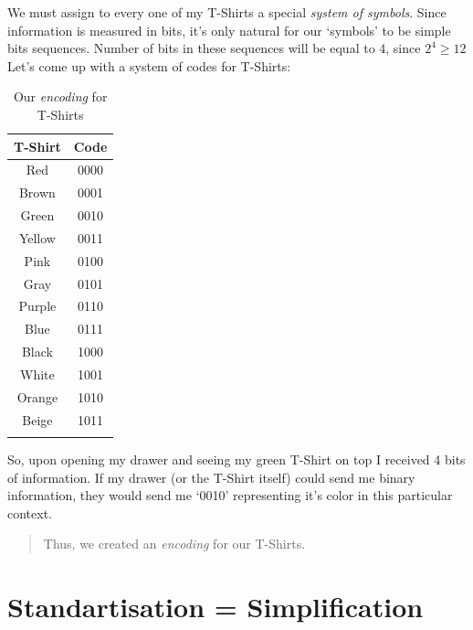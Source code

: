 \documentclass{report}
\begin{document}
            We must assign to every one of my T-Shirts a special \emph{system of symbols}. Since information is measured in bits, it's only natural for our `symbols' to 
            be simple bits sequences. Number of bits in these sequences will be equal to 4, since $2^4 \geq 12$\\
            Let's come up with a system of codes for T-Shirts:

            \begin{table}[H]
                \centering
                \begin{longtable}{cc}
                    \toprule
                    T-Shirt & Code \\
                    \toprule
                    Red & 0000 \\
                    Brown & 0001 \\
                    Green & 0010 \\
                    Yellow & 0011 \\
                    Pink & 0100 \\
                    Gray & 0101 \\
                    Purple & 0110 \\
                    Blue & 0111 \\
                    Black & 1000 \\
                    White & 1001 \\
                    Orange & 1010 \\
                    Beige & 1011 \\
                    \bottomrule
                    \caption{Our \emph{encoding} for T-Shirts}
                \end{longtable}
            \end{table}
            So, upon opening my drawer and seeing my green T-Shirt on top I received 4 bits of information. If my drawer (or the T-Shirt itself) could send me binary
            information, they would send me `0010' representing it's color in this particular context.\par

            \begin{quote}
                Thus, we created an \emph{encoding} for our T-Shirts.
            \end{quote}

            \newpage
        \section{Standartisation = Simplification}
\end{document}
